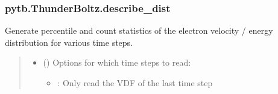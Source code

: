 \documentclass[letterpaper,10pt,english,openany,oneside]{sphinxmanual}
\begin{document}
\begin{fulllineitems}
\begin{fulllineitems}
\end{fulllineitems}


\sphinxstepscope


\subsubsection{pytb.ThunderBoltz.describe\_dist}
\label{\detokenize{api/pytb.ThunderBoltz.describe_dist:pytb-thunderboltz-describe-dist}}\label{\detokenize{api/pytb.ThunderBoltz.describe_dist::doc}}

\begin{fulllineitems}
\label{\detokenize{api/pytb.ThunderBoltz.describe_dist:pytb.ThunderBoltz.describe_dist}}
\pysigstartsignatures
{}
\pysigstopsignatures
\sphinxAtStartPar
Generate percentile and count statistics of the electron
velocity / energy distribution for various time steps.
\begin{quote}\begin{description}
\begin{itemize}
\item {} 
\sphinxAtStartPar
{} (\sphinxstyleliteralemphasis{\sphinxupquote{, }}\sphinxstyleliteralemphasis{\sphinxupquote{{[}}}\sphinxstyleliteralemphasis{\sphinxupquote{{]}}}) \textendash{} 
\sphinxAtStartPar
Options for which time steps to
read:
\begin{itemize}
\item {} 
\sphinxAtStartPar
{}: Only read the VDF of the last time step


\end{itemize}
\end{itemize}
\end{description}
\end{quote}
\end{fulllineitems}
\end{fulllineitems}
\end{document}

